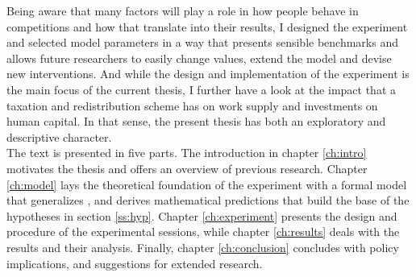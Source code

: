 Being aware that many factors will play a role in how people behave in competitions and how that translate into their results, I designed the experiment and selected model parameters in a way that presents sensible benchmarks and allows future researchers to easily change values, extend the model and devise new interventions. And while the design and implementation of the experiment is the main focus of the current thesis, I further have a look at the impact that a taxation and redistribution scheme has on work supply and investments on human capital. In that sense, the present thesis has both an exploratory and descriptive character.\\ 

The text is presented in five parts. The introduction in chapter \ref{ch:intro} motivates the thesis and offers an overview of previous research. Chapter \ref{ch:model} lays the theoretical foundation of the experiment with a formal model that generalizes \cite{koch2017}, and derives mathematical predictions that build the base of the hypotheses in section \ref{ss:hyp}. Chapter \ref{ch:experiment} presents the design and procedure of the experimental sessions, while chapter \ref{ch:results} deals with the results and their analysis. Finally, chapter \ref{ch:conclusion} concludes with policy implications, and suggestions for extended research.\\
